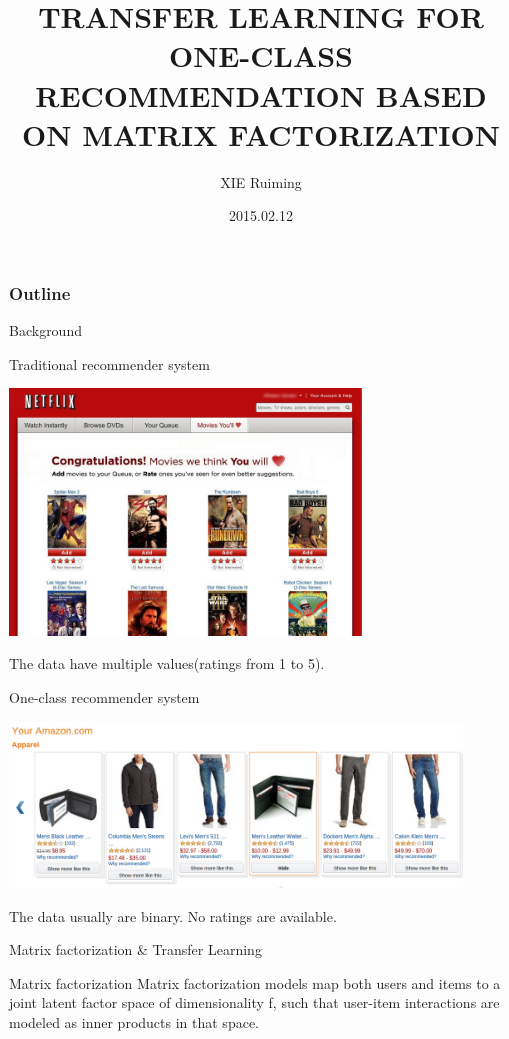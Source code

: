\documentclass[xetex,mathserif,serif]{beamer}
\title{TRANSFER LEARNING FOR ONE-CLASS RECOMMENDATION BASED ON MATRIX FACTORIZATION}
\author{XIE Ruiming}
\date{2015.02.12}
\begin{document}
\frame{\titlepage}
\begin{frame}
  \frametitle{Outline}
  \tableofcontents
\end{frame}
\begin{section}{Background}
  \begin{frame}{Traditional recommender system}
    \begin{center}
      \includegraphics[width=0.7\textwidth]{fig/netflix.jpg}
    \end{center}
    The data have multiple values(ratings from 1 to 5).
  \end{frame}
  \begin{frame}{One-class recommender system}
    \begin{center}
      \includegraphics[width=0.9\textwidth]{fig/amazon.png}
    \end{center}
    The data usually are binary. No ratings are available.
  \end{frame}

  \begin{frame}{Matrix factorization \& Transfer Learning}
    \begin{block}{Matrix factorization}
      Matrix factorization models map both users and items to a
      joint latent factor space of dimensionality f, such that user-item interactions are modeled as inner products in that space.


\end{block}
\end{frame}
\end{section}
\end{document}
